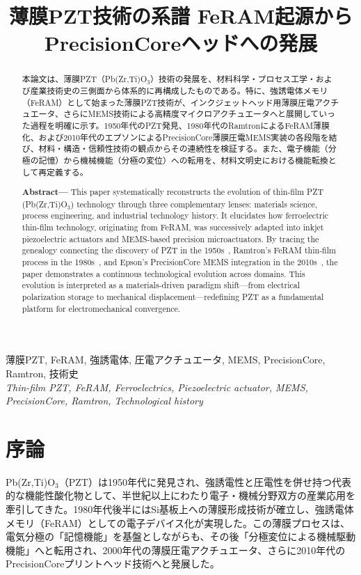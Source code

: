 \documentclass[conference]{IEEEtran}
\title{薄膜PZT技術の系譜 \Jemdash{} FeRAM起源からPrecisionCoreヘッドへの発展}
\author{%
  \IEEEauthorblockN{三溝 真一 (Shinichi Samizo)}%
  \IEEEauthorblockA{%
    独立系半導体研究者（元セイコーエプソン）\\%
    Independent Semiconductor Researcher (ex-Seiko Epson)\\[2pt]%
    Email:~\href{mailto:shin3t72@gmail.com}{shin3t72@gmail.com}\quad
    GitHub:~\url{https://github.com/Samizo-AITL}%
  }%
}
\date{}
\begin{document}
\maketitle

\begin{abstract}
本論文は、薄膜PZT（Pb(Zr,Ti)O$_3$）技術の発展を、材料科学・プロセス工学・および産業技術史の三側面から体系的に再構成したものである。特に、強誘電体メモリ（FeRAM）として始まった薄膜PZT技術が、インクジェットヘッド用薄膜圧電アクチュエータ、さらにMEMS技術による高精度マイクロアクチュエータへと展開していった過程を明確に示す。1950年代のPZT発見\cite{jaffe1954}、1980年代のRamtronによるFeRAM薄膜化\cite{ramtron_iedm1989,scott2000review}、および2010年代のエプソンによるPrecisionCore薄膜圧電MEMS実装\cite{uemura2014mems}の各段階を結び、材料・構造・信頼性技術の観点からその連続性を検証する。また、電子機能（分極の記憶）から機械機能（分極の変位）への転用を、材料文明史における機能転換として再定義する。
\medskip

\textbf{Abstract—}
This paper systematically reconstructs the evolution of thin-film PZT (Pb(Zr,Ti)O$_3$) technology through three complementary lenses: materials science, process engineering, and industrial technology history. It elucidates how ferroelectric thin-film technology, originating from FeRAM, was successively adapted into inkjet piezoelectric actuators and MEMS-based precision microactuators. By tracing the genealogy connecting the discovery of PZT in the 1950s~\cite{jaffe1954}, Ramtron’s FeRAM thin-film process in the 1980s~\cite{ramtron_iedm1989,scott2000review}, and Epson’s PrecisionCore MEMS integration in the 2010s~\cite{uemura2014mems}, the paper demonstrates a continuous technological evolution across domains. This evolution is interpreted as a materials-driven paradigm shift—from electrical polarization storage to mechanical displacement—redefining PZT as a fundamental platform for electromechanical convergence.
\end{abstract}

\begin{IEEEkeywords}
薄膜PZT, FeRAM, 強誘電体, 圧電アクチュエータ, MEMS, PrecisionCore, Ramtron, 技術史\\
\textit{Thin-film PZT, FeRAM, Ferroelectrics, Piezoelectric actuator, MEMS, PrecisionCore, Ramtron, Technological history}
\end{IEEEkeywords}

\section{序論}
Pb(Zr,Ti)O$_3$（PZT）は1950年代に発見され\cite{jaffe1954}、強誘電性と圧電性を併せ持つ代表的な機能性酸化物として、半世紀以上にわたり電子・機械分野双方の産業応用を牽引してきた。1980年代後半にはSi基板上への薄膜形成技術が確立し、強誘電体メモリ（FeRAM）としての電子デバイス化が実現した\cite{ramtron_iedm1989}。この薄膜プロセスは、電気分極の「記憶機能」を基盤としながらも、その後「分極変位による機械駆動機能」へと転用され、2000年代の薄膜圧電アクチュエータ、さらに2010年代のPrecisionCoreプリントヘッド技術へと発展した\cite{uemura2014mems,epson_wp_precisioncore}。
\end{document}
